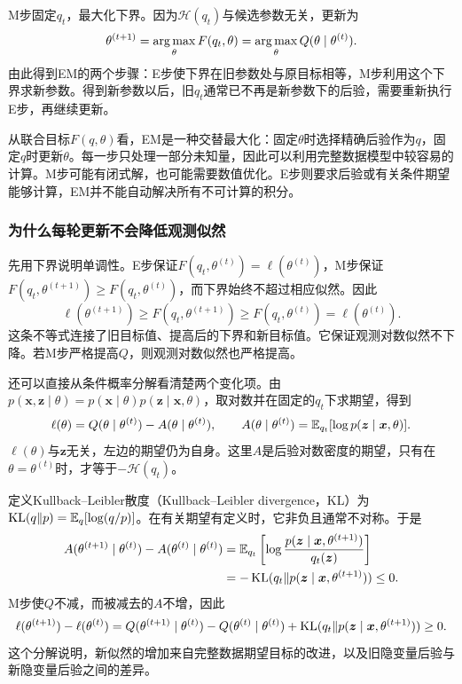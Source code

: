 M步固定$q_t$，最大化下界。因为$\mathcal H(q_t)$与候选参数无关，更新为
\begin{equation}
 \theta^{(t+1)}=\mathop{\mathrm{arg\,max}}_\theta F(q_t,\theta)
 =\mathop{\mathrm{arg\,max}}_\theta Q(\theta\mid\theta^{(t)}).
 \label{eq:solving-em-m}
\end{equation}
由此得到EM的两个步骤：E步使下界在旧参数处与原目标相等，M步利用这个下界求新参数。得到新参数以后，旧$q_t$通常已不再是新参数下的后验，需要重新执行E步，再继续更新。

从联合目标$F(q,\theta)$看，EM是一种交替最大化：固定$\theta$时选择精确后验作为$q$，固定$q$时更新$\theta$。每一步只处理一部分未知量，因此可以利用完整数据模型中较容易的计算。M步可能有闭式解，也可能需要数值优化。E步则要求后验或有关条件期望能够计算，EM并不能自动解决所有不可计算的积分。

\subsubsection{为什么每轮更新不会降低观测似然}
先用下界说明单调性。E步保证$F(q_t,\theta^{(t)})=\ell(\theta^{(t)})$，M步保证$F(q_t,\theta^{(t+1)})\geq F(q_t,\theta^{(t)})$，而下界始终不超过相应似然。因此
\begin{equation}
 \ell(\theta^{(t+1)})\geq F(q_t,\theta^{(t+1)})
 \geq F(q_t,\theta^{(t)})=\ell(\theta^{(t)}).
\end{equation}
这条不等式连接了旧目标值、提高后的下界和新目标值。它保证观测对数似然不下降。若M步严格提高$Q$，则观测对数似然也严格提高。

还可以直接从条件概率分解看清楚两个变化项。由$p(\bm x,\bm z\mid\theta)=p(\bm x\mid\theta)p(\bm z\mid\bm x,\theta)$，取对数并在固定的$q_t$下求期望，得到
\begin{equation}
 \ell(\theta)=Q(\theta\mid\theta^{(t)})-A(\theta\mid\theta^{(t)}),\qquad
 A(\theta\mid\theta^{(t)})=\mathbb{E}_{q_t}[\log p(\bm z\mid\bm x,\theta)].
\end{equation}
$\ell(\theta)$与$\bm z$无关，左边的期望仍为自身。这里$A$是后验对数密度的期望，只有在$\theta=\theta^{(t)}$时，才等于$-\mathcal H(q_t)$。

定义Kullback--Leibler散度（Kullback--Leibler divergence，KL）为$\operatorname{KL}(q\|p)=\mathbb{E}_q[\log(q/p)]$。在有关期望有定义时，它非负且通常不对称。于是
\begin{align}
 A(\theta^{(t+1)}\mid\theta^{(t)})-A(\theta^{(t)}\mid\theta^{(t)})
 &=\mathbb{E}_{q_t}\left[\log\frac{p(\bm z\mid\bm x,\theta^{(t+1)})}{q_t(\bm z)}\right]\\
 &=-\operatorname{KL}(q_t\|p(\bm z\mid\bm x,\theta^{(t+1)}))\leq0.
\end{align}
M步使$Q$不减，而被减去的$A$不增，因此
\begin{equation}
 \ell(\theta^{(t+1)})-\ell(\theta^{(t)})
 =Q(\theta^{(t+1)}\mid\theta^{(t)})-Q(\theta^{(t)}\mid\theta^{(t)})
 +\operatorname{KL}(q_t\|p(\bm z\mid\bm x,\theta^{(t+1)}))\geq0.
\end{equation}
这个分解说明，新似然的增加来自完整数据期望目标的改进，以及旧隐变量后验与新隐变量后验之间的差异。

